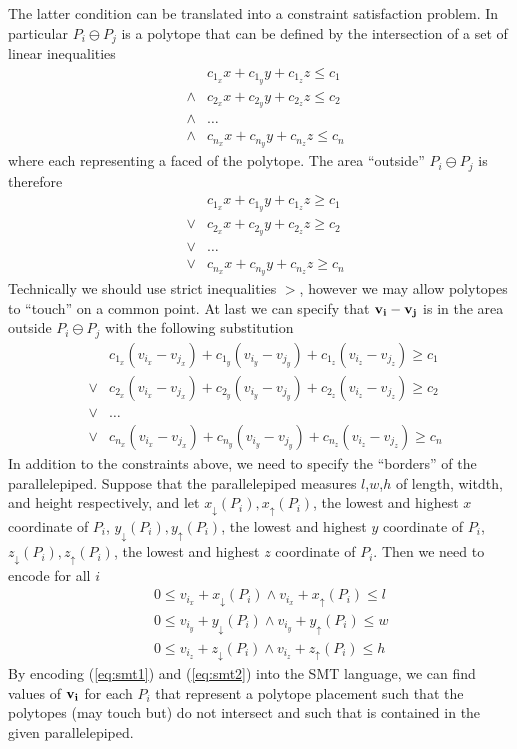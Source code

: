 The latter condition can be translated into a constraint satisfaction
problem. In particular $P_i \ominus P_j$ is a polytope that can be
defined by the intersection of a set of linear inequalities
\begin{eqnarray}
\nonumber
&        & c_{1_x} x + c_{1_y} y + c_{1_z} z \leq c_1 \\
\nonumber
& \wedge & c_{2_x} x + c_{2_y} y + c_{2_z} z \leq c_2 \\
\nonumber
& \wedge & \ldots \\
\nonumber
& \wedge & c_{n_x} x + c_{n_y} y + c_{n_z} z \leq c_n
\end{eqnarray}
where each representing a faced of the polytope. The
area ``outside'' $P_i \ominus P_j$ is therefore
\begin{eqnarray}
\nonumber
&      & c_{1_x} x + c_{1_y} y + c_{1_z} z \geq c_1 \\
\nonumber
& \vee & c_{2_x} x + c_{2_y} y + c_{2_z} z \geq c_2 \\
\nonumber
& \vee & \ldots \\
\nonumber
& \vee & c_{n_x} x + c_{n_y} y + c_{n_z} z \geq c_n
\end{eqnarray}
Technically we should use strict inequalities $>$, however
we may allow polytopes to ``touch'' on a common point. At last
we can specify that $\mathbf{v_i} - \mathbf{v_j}$ is in the
area outside $P_i \ominus P_j$ with the following substitution
\begin{eqnarray}
\nonumber
&      & c_{1_x} (v_{i_x} - v_{j_x}) + c_{1_y} (v_{i_y} - v_{j_y}) + c_{1_z} (v_{i_z}-v_{j_z}) \geq c_1 \\
\nonumber
& \vee & c_{2_x} (v_{i_x} - v_{j_x}) + c_{2_y} (v_{i_y} - v_{j_y}) + c_{2_z} (v_{i_z}-v_{j_z}) \geq c_2 \\
\label{eq:smt1}
& \vee &\ldots \\                                                                                    
\nonumber
& \vee & c_{n_x} (v_{i_x} - v_{j_x}) + c_{n_y} (v_{i_y} - v_{j_y}) + c_{n_z} (v_{i_z}-v_{j_z}) \geq c_n
\end{eqnarray}
In addition to the constraints above, we need to specify the ``borders'' of the parallelepiped. Suppose
that the parallelepiped measures $l$,$w$,$h$ of length, witdth, and height respectively, and let
$x_\downarrow(P_i), x_\uparrow(P_i)$, the lowest and highest $x$ coordinate of $P_i$, 
$y_\downarrow(P_i), y_\uparrow(P_i)$, the lowest and highest $y$ coordinate of $P_i$, 
$z_\downarrow(P_i), z_\uparrow(P_i)$, the lowest and highest $z$ coordinate of $P_i$. Then we
need to encode for all $i$
\begin{eqnarray}
\nonumber
&& 0 \leq v_{i_x} + x_\downarrow(P_i) \wedge v_{i_x} + x_\uparrow(P_i) \leq l \\
\label{eq:smt2}
&& 0 \leq v_{i_y} + y_\downarrow(P_i) \wedge v_{i_y} + y_\uparrow(P_i) \leq w \\
\nonumber
&& 0 \leq v_{i_z} + z_\downarrow(P_i) \wedge v_{i_z} + z_\uparrow(P_i) \leq h
\end{eqnarray}
By encoding (\ref{eq:smt1}) and (\ref{eq:smt2}) into the SMT language, we can find
values of $\mathbf{v_i}$ for each $P_i$ that represent a polytope placement such
that the polytopes (may touch but) do not intersect and such that
is contained in the given parallelepiped.
